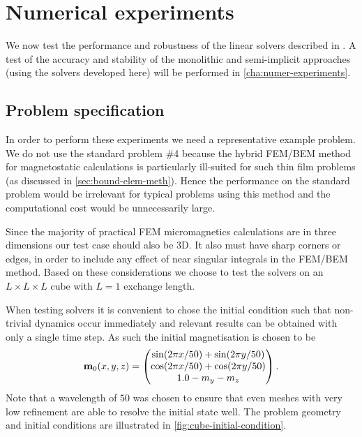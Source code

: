 \section{Numerical experiments}
\label{sec:numer-exper-fem-bem-systems}


We now test the performance and robustness of the linear solvers described in .
A test of the accuracy and stability of the monolithic and semi-implicit approaches (using the solvers developed here) will be performed in \cref{cha:numer-experiments}.


\subsection{Problem specification}
\label{sec:linear-systems-probl-spec}

In order to perform these experiments we need a representative example problem.
We do not use the \mumag standard problem \#4 because the hybrid FEM/BEM method for magnetostatic calculations is particularly ill-suited for such thin film problems (as discussed in \cref{sec:bound-elem-meth}).
Hence the performance on the standard problem would be irrelevant for typical problems using this method and the computational cost would be unnecessarily large.

Since the majority of practical FEM micromagnetics calculations are in three dimensions our test case should also be 3D.
It also must have sharp corners or edges, in order to include any effect of near singular integrals in the FEM/BEM method.
Based on these considerations we choose to test the solvers on an $L\times L \times L$ cube with $L=1$ exchange length.

When testing solvers it is convenient to chose the initial condition such that non-trivial dynamics occur immediately and relevant results can be obtained with only a single time step.
As such the initial magnetisation is chosen to be
\begin{equation}
  \boldsymbol{\mathrm{m}}_0(x, y, z) = \begin{pmatrix} \sin(2\pi x/50) + \sin(2\pi y/50) \\ \cos(2\pi x/50) + \cos(2 \pi y/50) \\ 1.0 - m_y - m_z \end{pmatrix}.
\end{equation}
Note that a wavelength of $50$ was chosen to ensure that even meshes with very low refinement are able to resolve the initial state well.
The problem geometry and initial conditions are illustrated in \cref{fig:cube-initial-condition}.

